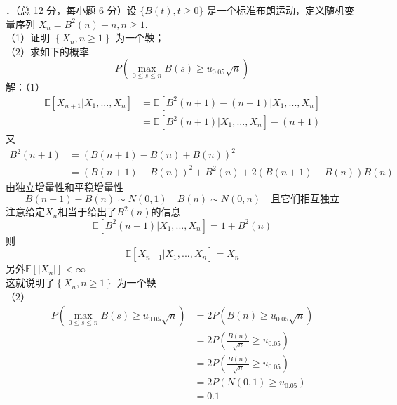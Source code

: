 \documentclass[UTF8,openany]{book}
\begin{document}
．（总 12 分，每小题 6 分）设 $\{B(t), t \geq 0\}$ 是一个标准布朗运动，定义随机变量序列 $X_{n}=B^{2}(n)-n, n \geq 1$.\\
（1）证明 $\left\{X_{n}, n \geq 1\right\}$ 为一个鞅；\\
（2）求如下的概率
$$
P\left(\max _{0 \leq s \leq n} B(s) \geq u_{0.05} \sqrt{n}\right)
$$
解：（1）\\
$$
\begin{aligned}
	\mathbb{E}\left[X_{n+1}|X_1,...,X_n \right]&=\mathbb{E}\left[B^2(n+1)-(n+1)|X_1,...,X_n \right]  \\
	&=\mathbb{E}\left[B^2(n+1)|X_1,...,X_n \right]-(n+1)
\end{aligned}
$$
又
$$
\begin{aligned}
	B^2(n+1)&=\left(B(n+1)-B(n)+B(n) \right)^2\\
	&=\left(B(n+1)-B(n) \right)^2+B^2(n)+2 \left(B(n+1)-B(n) \right)B(n)
\end{aligned}
$$
由独立增量性和平稳增量性
\[
B(n+1)-B(n)\sim N(0,1) \quad B(n)\sim N(0,n)\quad \text{且它们相互独立} 
\]
注意给定$X_n$相当于给出了$B^2(n)$的信息
\[
\mathbb{E}\left[B^2(n+1)|X_1,...,X_n \right]=1+B^2(n)
\]
则
\[
\mathbb{E}\left[X_{n+1}|X_1,...,X_n \right]=X_n
\]
另外$\mathbb{E}[|X_n|]<\infty$\\
这就说明了$\left\{X_{n}, n \geq 1\right\}$ 为一个鞅\\
（2）\\
$$
\begin{aligned}
	P\left(\max _{0 \leq s \leq n} B(s) \geq u_{0.05} \sqrt{n}\right)&=2P\left(B(n)\ge u_{0.05} \sqrt{n} \right)\\
	&=2P\left(\frac{B(n)}{\sqrt{n}}\ge u_{0.05} \right)\\
	&=2P\left(\frac{B(n)}{\sqrt{n}}\ge u_{0.05} \right)\\
	&=  2P\left(N(0,1)\ge u_{0.05} \right)\\
	&= 0.1   
\end{aligned}
$$
\end{document}
